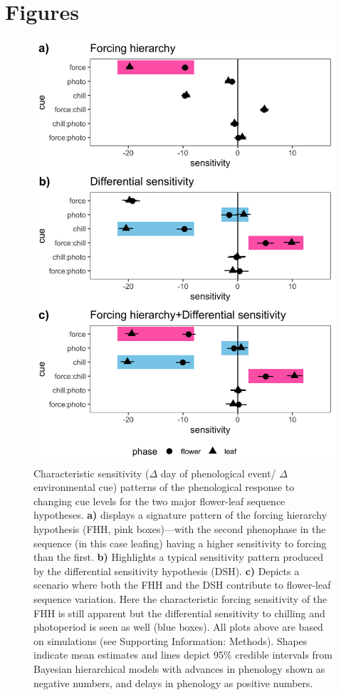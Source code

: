 \documentclass[12pt]{article}\usepackage[]{graphicx}\usepackage[]{color}
\begin{document}
\section*{Figures}
\begin{figure}[h!]
    \centering
         \includegraphics[width=.7\textwidth]{..//Plots/Flobuds_manuscript_figs/simulations.png}
    \caption{Characteristic sensitivity ($\Delta$ day of phenological event/ $\Delta$ environmental cue) patterns of the phenological response to changing cue levels for the two major flower-leaf sequence hypotheses.  \textbf{a)} displays a signature pattern of the forcing hierarchy hypothesis (FHH, pink boxes)---with the second phenophase in the sequence (in this case leafing) having a higher sensitivity to forcing than the first.  \textbf{b)} Highlights a typical sensitivity pattern produced by the differential sensitivity hypothesis (DSH). \textbf{c)} Depicts a scenario where both the FHH and the DSH contribute to flower-leaf sequence variation. Here the characteristic forcing sensitivity of the FHH is still apparent but the differential sensitivity to chilling and photoperiod is seen as well (blue boxes). All plots above are based on simulations (see Supporting Information: Methods). Shapes indicate mean estimates and lines depict 95\% credible intervals from Bayesian hierarchical models with advances in phenology shown as negative numbers, and delays in phenology as positive numbers. } 
    \label{fig:simulations}
\end{figure}
\clearall 
\end{document}
